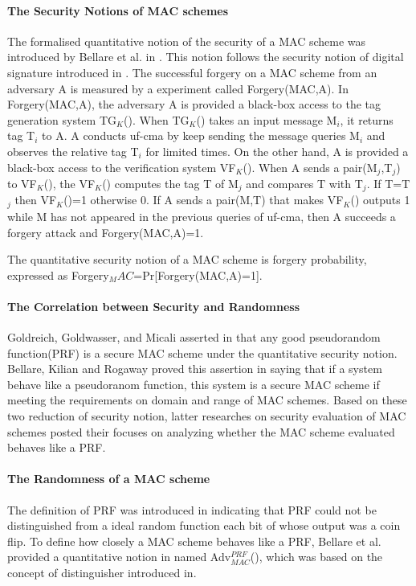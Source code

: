 \documentclass{article}
\begin{document}
\paragraph{The Security Notions of MAC schemes}
The formalised quantitative notion of the security of a MAC scheme was introduced by Bellare et al. in \cite{cbc1994}. This notion follows the security notion of digital signature introduced in \cite{signature}. The successful forgery on a MAC scheme from an adversary A is measured by a experiment called Forgery(MAC,A). In Forgery(MAC,A),  
the adversary A is provided a black-box access to the tag generation system TG$_K$(). When TG$_K$() takes an input message M$_i$, it returns tag T$_i$ to A. A conducts uf-cma by keep sending the message queries M$_i$ and observes the relative tag T$_i$ for limited times. On the other hand, A is provided a black-box access to the verification system VF$_K$(). When A sends a pair(M$_j$,T$_j$) to VF$_K$(), the VF$_K$() computes the tag T of M$_j$ and compares T with T$_j$. If T=T$_j$ then VF$_K$()=1 otherwise 0. If A sends a pair(M,T) that makes VF$_K$() outputs 1 while M has not appeared in the previous queries of uf-cma, then A succeeds a forgery attack and Forgery(MAC,A)=1.

The quantitative security notion of a MAC scheme is forgery probability, expressed as Forgery$_MAC$=Pr[Forgery(MAC,A)=1].
\paragraph{The Correlation between Security and Randomness}
Goldreich, Goldwasser, and Micali asserted in \cite{prf} that any good pseudorandom function(PRF) is a secure MAC scheme under the quantitative security notion. Bellare, Kilian and Rogaway proved this assertion in \cite{cbc1994} saying that if a system behave like a pseudoranom function, this system is a secure MAC scheme if meeting the requirements on domain and range of MAC schemes. Based on these two reduction of security notion, latter researches on security evaluation of MAC schemes posted their focuses on analyzing whether the MAC scheme evaluated behaves like a PRF.
\paragraph{The Randomness of a MAC scheme}
The definition of PRF was introduced in \cite{prf} indicating that PRF could not be distinguished from a ideal random function each bit of whose output was a coin flip. To define how closely a MAC scheme behaves like a PRF, Bellare et al. provided a quantitative notion in \cite{cbc1994} named Adv$^{PRF}_{MAC}$(), which was based on the concept of distinguisher introduced in\cite{prf}. 
\end{document}
